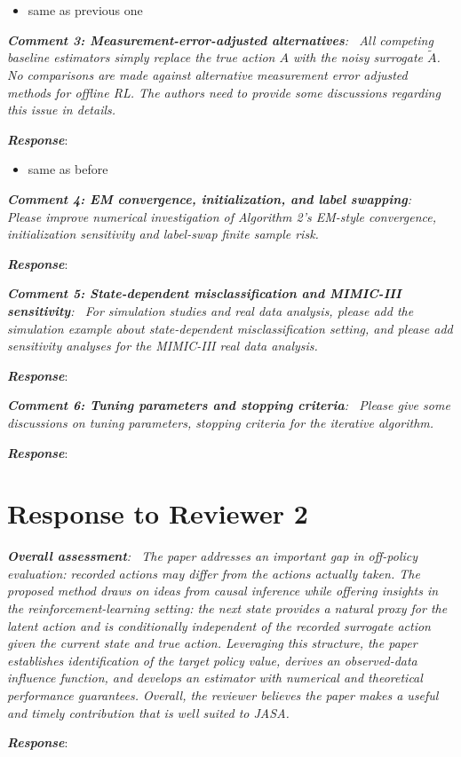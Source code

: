 \documentclass[12pt]{article}
\newcommand{\0}{\boldsymbol{0}}
\theoremstyle{definition}
\newcommand{\reviewcomment}[1]{\par\begingroup\itshape\noindent\textbf{#1}:\ }
\newcommand{\reviewresponse}{\par\endgroup\noindent\textbf{\textit{Response}}:\ }
\begin{document}
\begin{itemize}
    \item same as previous one
\end{itemize}

\reviewcomment{Comment 3: Measurement-error-adjusted alternatives} All competing baseline estimators simply replace the true action $A$ with the noisy surrogate $\widetilde{A}$. No comparisons are made against alternative measurement error adjusted methods for offline RL. The authors need to provide some discussions regarding this issue in details.
\reviewresponse

\begin{itemize}
    \item same as before
\end{itemize}

\reviewcomment{Comment 4: EM convergence, initialization, and label swapping} Please improve numerical investigation of Algorithm 2's EM-style convergence, initialization sensitivity and label-swap finite sample risk.
\reviewresponse

\reviewcomment{Comment 5: State-dependent misclassification and MIMIC-III sensitivity} For simulation studies and real data analysis, please add the simulation example about state-dependent misclassification setting, and please add sensitivity analyses for the MIMIC-III real data analysis.
\reviewresponse

\reviewcomment{Comment 6: Tuning parameters and stopping criteria} Please give some discussions on tuning parameters, stopping criteria for the iterative algorithm.
\reviewresponse

\section*{Response to Reviewer 2}

\reviewcomment{Overall assessment} The paper addresses an important gap in off-policy evaluation: recorded actions may differ from the actions actually taken. The proposed method draws on ideas from causal inference while offering insights in the reinforcement-learning setting: the next state provides a natural proxy for the latent action and is conditionally independent of the recorded surrogate action given the current state and true action. Leveraging this structure, the paper establishes identification of the target policy value, derives an observed-data influence function, and develops an estimator with numerical and theoretical performance guarantees. Overall, the reviewer believes the paper makes a useful and timely contribution that is well suited to JASA.
\reviewresponse
\end{document}
